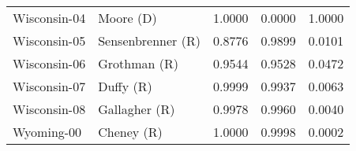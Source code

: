 \begin{longtable}{llrll}
      Wisconsin-04 &           {\color{Blue} Moore (D)} &       1.0000 &        0.0000 &        1.0000 \\
      Wisconsin-05 &    {\color{Red} Sensenbrenner (R)} &       0.8776 &        0.9899 &        0.0101 \\
      Wisconsin-06 &         {\color{Red} Grothman (R)} &       0.9544 &        0.9528 &        0.0472 \\
      Wisconsin-07 &            {\color{Red} Duffy (R)} &       0.9999 &        0.9937 &        0.0063 \\
      Wisconsin-08 &        {\color{Red} Gallagher (R)} &       0.9978 &        0.9960 &        0.0040 \\
        Wyoming-00 &           {\color{Red} Cheney (R)} &       1.0000 &        0.9998 &        0.0002 \\
\end{longtable}
